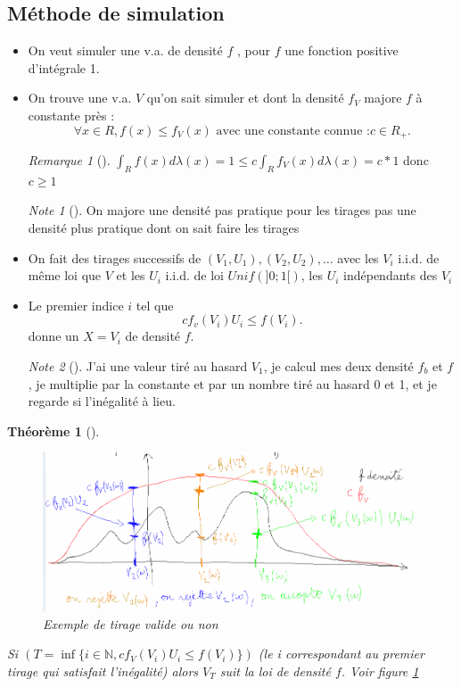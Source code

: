 \documentclass{article}
\theoremstyle{plain}%
\newtheorem{thm}{Théorème}[section]
\theoremstyle{definition}
\theoremstyle{remark}
\newtheorem*{rem}{Remarque}
\newtheorem*{note}{Note}
\begin{document}
\subsection{Méthode de simulation}
\begin{itemize}
	\item On veut simuler une v.a. de densité $ f $ , pour $ f $  une fonction positive d'intégrale 1.
	\item On trouve une v.a. $ V $ qu'on sait simuler et dont la densité $ f_V $ majore $ f $ à constante près : 
	\[
		\forall x \in R, f(x) \leq f_V(x) \text{ avec une constante connue :} c \in R_+
	.\]
	\begin{rem}[]
		$ \int_{R}^{}f(x)d \lambda (x) = 1 \leq c \int_{R}^{}f_V(x)d \lambda (x) = c*1$ donc $ c \geq 1$  
	\end{rem}
	\begin{note}[]
		On majore une densité pas pratique pour les tirages pas une densité plus pratique dont on sait faire les tirages
	\end{note}

	\item On fait des tirages successifs de $(V_1, U_1), (V_2, U_2), \dots$ avec les $ V_i $ i.i.d. de même loi que $ V $ et les $ U_i $ i.i.d. de loi $ Unif(]0;1[) $, les $ U_i $ indépendants des $ V_i $ 
	
	\item Le premier indice $ i $ tel que 
	\[
		cf_v(V_i)U_i \leq f(V_i)
	.\]
	donne un $ X=V_i $ de densité $ f $.
	\begin{note}[]
		J'ai une valeur tiré au hasard $V_1$, je calcul mes deux densité $f_b$ et $f$, je multiplie par la constante et par un nombre tiré au hasard 0 et 1, et je regarde si l'inégalité à lieu.
	\end{note}
\end{itemize}
\begin{thm}[]
	\begin{figure}[!htbp]
		\centering
		\includegraphics*[width=\textwidth]{figures2/fig1.png}
		\caption{Exemple de tirage valide ou non}
		\label{fig1}
	\end{figure}      
	Si $(T=\inf \{i \in \mathbb{N}, cf_V(V_i)U_i \leq f(V_i)\})$ (le i correspondant au premier tirage qui satisfait l'inégalité) alors $ V_T $ suit la loi de densité $ f $. Voir figure \ref{fig1}
\end{thm}
\end{document}
